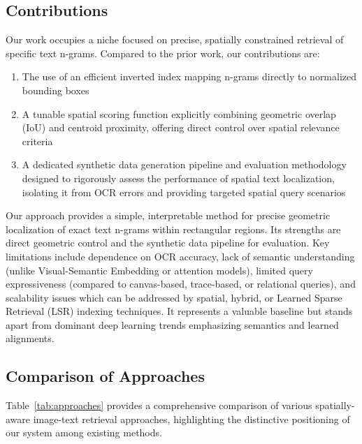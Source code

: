 \documentclass[sigconf,screen]{acmart}
\begin{document}
\subsection{Contributions}

Our work occupies a niche focused on precise, spatially constrained retrieval of specific text n-grams. Compared to the prior work, our contributions are:

\begin{enumerate}
    \item The use of an efficient inverted index mapping n-grams directly to normalized bounding boxes
    \item A tunable spatial scoring function explicitly combining geometric overlap (IoU) and centroid proximity, offering direct control over spatial relevance criteria
    \item A dedicated synthetic data generation pipeline and evaluation methodology designed to rigorously assess the performance of spatial text localization, isolating it from OCR errors and providing targeted spatial query scenarios
\end{enumerate}

Our approach provides a simple, interpretable method for precise geometric localization of exact text n-grams within rectangular regions. Its strengths are direct geometric control and the synthetic data pipeline for evaluation. Key limitations include dependence on OCR accuracy, lack of semantic understanding (unlike Visual-Semantic Embedding or attention models), limited query expressiveness (compared to canvas-based, trace-based, or relational queries), and scalability issues which can be addressed by spatial, hybrid, or Learned Sparse Retrieval (LSR) indexing techniques. It represents a valuable baseline but stands apart from dominant deep learning trends emphasizing semantics and learned alignments.

\subsection{Comparison of Approaches}

Table~\ref{tab:approaches} provides a comprehensive comparison of various spatially-aware image-text retrieval approaches, highlighting the distinctive positioning of our system among existing methods.
\end{document}
